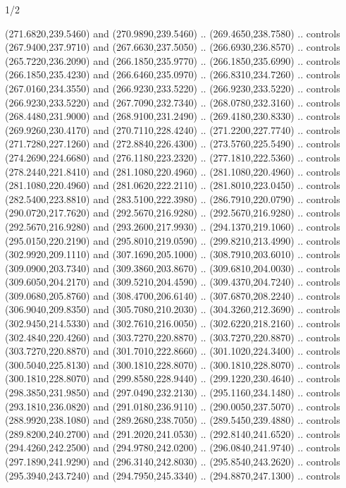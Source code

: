 \begin{flagdescription}{1/2}
\begin{scope}[xshift=0.5\flaglength]
\begin{scope}[scale=0.004\flagwidth,xshift=-90mm,yshift=89mm]
\begin{scope}[y=0.80pt, x=0.80pt, yscale=-1, xscale=1, inner sep=0pt, outer sep=0pt]
  (271.6820,239.5460) and (270.9890,239.5460) .. (269.4650,238.7580) .. controls
  (267.9400,237.9710) and (267.6630,237.5050) .. (266.6930,236.8570) .. controls
  (265.7220,236.2090) and (266.1850,235.9770) .. (266.1850,235.6990) .. controls
  (266.1850,235.4230) and (266.6460,235.0970) .. (266.8310,234.7260) .. controls
  (267.0160,234.3550) and (266.9230,233.5220) .. (266.9230,233.5220) .. controls
  (266.9230,233.5220) and (267.7090,232.7340) .. (268.0780,232.3160) .. controls
  (268.4480,231.9000) and (268.9100,231.2490) .. (269.4180,230.8330) .. controls
  (269.9260,230.4170) and (270.7110,228.4240) .. (271.2200,227.7740) .. controls
  (271.7280,227.1260) and (272.8840,226.4300) .. (273.5760,225.5490) .. controls
  (274.2690,224.6680) and (276.1180,223.2320) .. (277.1810,222.5360) .. controls
  (278.2440,221.8410) and (281.1080,220.4960) .. (281.1080,220.4960) .. controls
  (281.1080,220.4960) and (281.0620,222.2110) .. (281.8010,223.0450) .. controls
  (282.5400,223.8810) and (283.5100,222.3980) .. (286.7910,220.0790) .. controls
  (290.0720,217.7620) and (292.5670,216.9280) .. (292.5670,216.9280) .. controls
  (292.5670,216.9280) and (293.2600,217.9930) .. (294.1370,219.1060) .. controls
  (295.0150,220.2190) and (295.8010,219.0590) .. (299.8210,213.4990) .. controls
  (302.9920,209.1110) and (307.1690,205.1000) .. (308.7910,203.6010) .. controls
  (309.0900,203.7340) and (309.3860,203.8670) .. (309.6810,204.0030) .. controls
  (309.6050,204.2170) and (309.5210,204.4590) .. (309.4370,204.7240) .. controls
  (309.0680,205.8760) and (308.4700,206.6140) .. (307.6870,208.2240) .. controls
  (306.9040,209.8350) and (305.7080,210.2030) .. (304.3260,212.3690) .. controls
  (302.9450,214.5330) and (302.7610,216.0050) .. (302.6220,218.2160) .. controls
  (302.4840,220.4260) and (303.7270,220.8870) .. (303.7270,220.8870) .. controls
  (303.7270,220.8870) and (301.7010,222.8660) .. (301.1020,224.3400) .. controls
  (300.5040,225.8130) and (300.1810,228.8070) .. (300.1810,228.8070) .. controls
  (300.1810,228.8070) and (299.8580,228.9440) .. (299.1220,230.4640) .. controls
  (298.3850,231.9850) and (297.0490,232.2130) .. (295.1160,234.1480) .. controls
  (293.1810,236.0820) and (291.0180,236.9110) .. (290.0050,237.5070) .. controls
  (288.9920,238.1080) and (289.2680,238.7050) .. (289.5450,239.4880) .. controls
  (289.8200,240.2700) and (291.2020,241.0530) .. (292.8140,241.6520) .. controls
  (294.4260,242.2500) and (294.9780,242.0200) .. (296.0840,241.9740) .. controls
  (297.1890,241.9290) and (296.3140,242.8030) .. (295.8540,243.2620) .. controls
  (295.3940,243.7240) and (294.7950,245.3340) .. (294.8870,247.1300) .. controls

\end{scope}
\end{scope}
\end{scope}
\end{flagdescription}
